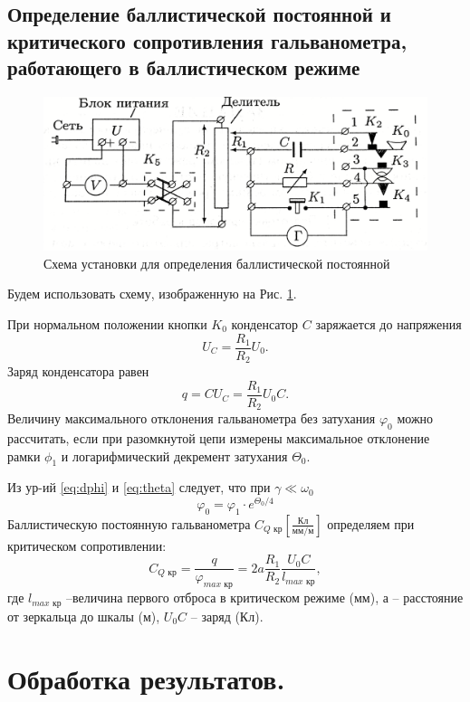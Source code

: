 \documentclass[a4paper, 12pt, twoside]{article}
\begin{document}
\subsection{Определение баллистической постоянной и критического сопротивления гальванометра, работающего в баллистическом режиме}
\begin{figure}[H]
	\centering
	\includegraphics[width = 0.7\linewidth]{sch3}
	\caption{Схема установки для определения баллистической постоянной}
	\label{sch:3}
\end{figure}
Будем использовать схему, изображенную на Рис. \ref{sch:3}.

При нормальном положении кнопки $K_0$ конденсатор $C$ заряжается до напряжения
\begin{equation}\nonumber
U_C = \dfrac{R_1}{R_2}U_0.
\end{equation}
Заряд конденсатора равен
\begin{equation}
q = CU_C = \dfrac{R_1}{R_2}U_0C.
\end{equation}
Величину максимального отклонения гальванометра без затухания $\varphi_0$ можно рассчитать, если при разомкнутой цепи измерены максимальное отклонение рамки $\phi_1$ и логарифмический декремент затухания $\varTheta_0$.

Из ур-ий \eqref{eq:dphi} и \eqref{eq:theta}  следует, что при $\gamma \ll \omega_0$
\begin{equation}
\label{f23}
\varphi_0 = \varphi_1\cdot e^{\varTheta_0/4}
\end{equation}
Баллистическую постоянную гальванометра $C_{Q\text{ кр}}\left[\frac{\text{Кл}}{\text{мм/м}}\right]$ определяем при критическом сопротивлении:
\begin{equation}
\label{f24}
C_{Q\text{ кр}} = \dfrac{q}{\varphi_{max\text{ кр}}} = 2a\dfrac{R_1}{R_2}\dfrac{U_0C}{l_{max\text{ кр}}},
\end{equation}
где $l_{max\text{ кр}}$ --величина первого отброса в критическом режиме (мм), $а$ -- расстояние от зеркальца до шкалы (м), $U_0C$ -- заряд (Кл).
\newpage

\section{Обработка результатов.}
\end{document}

